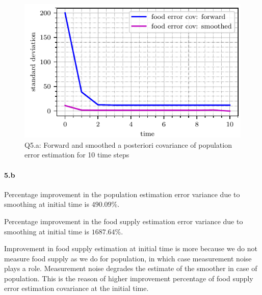 \begin{figure}[!h]
	\centering
	\includegraphics[scale=1.0,trim={0cm 0cm 0cm 0cm},clip]{./code/generatedPlots/q5_food_cov.pdf}
	\caption{Q5.a: Forward and smoothed a posteriori covariance of population error estimation for 10 time steps}
	\label{fig:q5_food_cov}
\end{figure}
\paragraph{5.b}
Percentage improvement in the population estimation error variance due to smoothing at initial time is $490.09$\%.

Percentage improvement in the food supply estimation error variance due to smoothing at initial time is $1687.64$\%.

Improvement in food supply estimation at initial time is more because we do not measure food supply as we do for population, in which case measurement noise plays a role. Measurement noise degrades the estimate of the smoother in case of population. This is the reason of higher improvement percentage of food supply error estimation covariance at the initial time.
